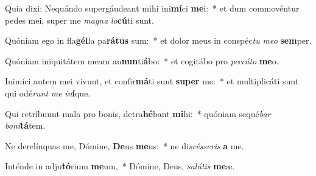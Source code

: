 \item Quia dixi: Nequándo supergáudeant mihi ini\textbf{mí}ci \textbf{me}i:~* et dum commovéntur pedes mei, super me \textit{ma}\textit{gna} \textit{lo}\textbf{cú}ti sunt.
\item Quóniam ego in fla\textbf{gél}la pa\textbf{rá}\textbf{tus} sum:~* et dolor meus in conspéc\textit{tu} \textit{me}\textit{o} \textbf{sem}per.
\item Quóniam iniquitátem meam an\textbf{nun}ti\textbf{á}bo:~* et cogitábo pro \textit{pec}\textit{cá}\textit{to} \textbf{me}o.
\item Inimíci autem mei vivunt, et confir\textbf{má}ti sunt \textbf{su}\textbf{per} me:~* et multiplicáti sunt qui odé\textit{runt} \textit{me} \textit{in}\textbf{í}que.
\item Qui retríbuunt mala pro bonis, detra\textbf{hé}bant \textbf{mi}hi:~* quóniam sequé\textit{bar} \textit{bo}\textit{ni}\textbf{tá}tem.
\item Ne derelínquas me, Dómine, \textbf{De}us \textbf{me}us:~* ne di\textit{scés}\textit{se}\textit{ris} \textbf{a} me.
\item Inténde in adju\textbf{tó}rium \textbf{me}um,~* Dómine, Deus, \textit{sa}\textit{lú}\textit{tis} \textbf{me}æ.
